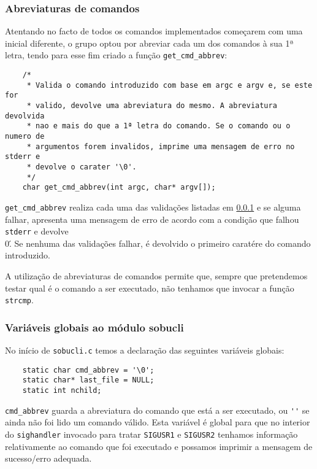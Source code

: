 \documentclass[a4paper,12pt,titlepage,portuguese]{article}
\begin{document}
\begin{itemize}
\subsubsection{Abreviaturas de comandos} \label{Abreviaturas de comandos}

Atentando no facto de todos os comandos implementados começarem com uma inicial diferente, o grupo optou por abreviar cada um dos comandos à sua 1ª letra, tendo para esse fim criado a função \texttt{get_cmd_abbrev}:

	\begin{verbatim}
	/* 
 	 * Valida o comando introduzido com base em argc e argv e, se este for
 	 * valido, devolve uma abreviatura do mesmo. A abreviatura devolvida
 	 * nao e mais do que a 1ª letra do comando. Se o comando ou o numero de
 	 * argumentos forem invalidos, imprime uma mensagem de erro no stderr e 
 	 * devolve o carater '\0'.
 	 */
	char get_cmd_abbrev(int argc, char* argv[]);
	\end{verbatim}
\texttt{get_cmd_abbrev} realiza cada uma das validações listadas em \ref{Abreviaturas de comandos} e se alguma falhar, apresenta uma mensagem de erro de acordo com a condição que falhou \texttt{stderr} e devolve \'\\0\'. Se nenhuma das validações falhar, é devolvido o primeiro caratére do comando introduzido. 

A utilização de abreviaturas de comandos permite que, sempre que pretendemos testar qual é o comando a ser executado, não tenhamos que invocar a função \texttt{strcmp}.

\subsubsection{Variáveis globais ao módulo sobucli}

No início de \texttt{sobucli.c} temos a declaração das seguintes variáveis globais:

	\begin{verbatim}
	static char cmd_abbrev = '\0';
	static char* last_file = NULL;
	static int nchild;
	\end{verbatim}
\texttt{cmd_abbrev} guarda a abreviatura do comando que está a ser executado, ou \texttt{\'\0\'} se ainda não foi lido um comando válido. Esta variável é global para que no interior do \texttt{sighandler} invocado para tratar \texttt{SIGUSR1} e \texttt{SIGUSR2} tenhamos informação relativamente ao comando que foi executado e possamos imprimir a mensagem de sucesso/erro adequada. 


\end{itemize}
\end{document}
